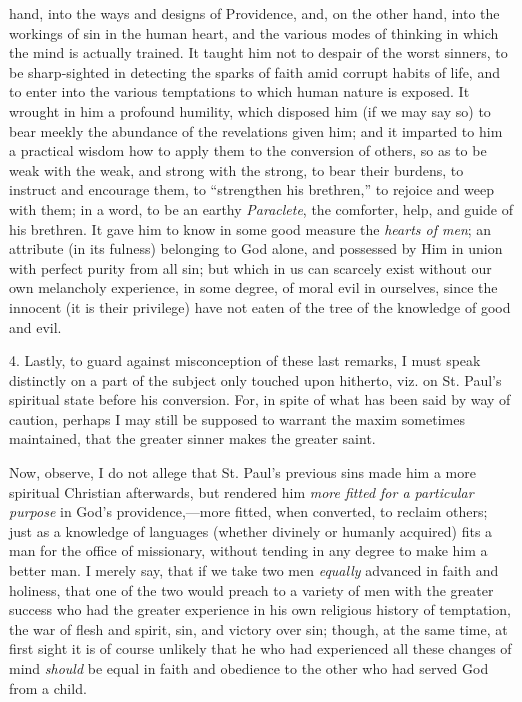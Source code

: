 hand, into the ways and designs of Providence, and, on the other hand,
into the workings of sin in the human heart, and the various modes of
thinking in which the mind is actually trained. It taught him not to
despair of the worst sinners, to be sharp-sighted in detecting the
sparks of faith amid corrupt habits of life, and to enter into the
various temptations to which human nature is exposed. It wrought in
him a profound humility, which disposed him (if we may say so) to bear
meekly the abundance of the revelations given him; and it imparted to
him a practical wisdom how to apply them to the conversion of others,
so as to be weak with the weak, and strong with the strong, to bear
their burdens, to instruct and encourage them, to ``strengthen his
brethren,'' to rejoice and weep with them; in a word, to be an
earthy \emph{Paraclete}, the comforter, help, and guide of his
brethren. It gave him to know in some good measure the \emph{hearts of
men}; an attribute (in its fulness) belonging to God alone, and
possessed by Him in union with perfect purity from all sin; but which
in us can scarcely exist without our own melancholy experience, in
some degree, of moral evil in ourselves, since the innocent (it is
their privilege) have not eaten of the tree of the knowledge of good
and evil.

4. Lastly, to guard against misconception of these last remarks, I
must speak distinctly on a part of the subject only touched upon
hitherto, viz. on St. Paul's spiritual state before his conversion.
For, in spite of what has been said by way of caution, perhaps I may
still be supposed to warrant the maxim sometimes maintained, that the
greater sinner makes the greater saint.

Now, observe, I do not allege that St. Paul's previous sins made
him a more spiritual Christian afterwards, but rendered him \emph{more
fitted for a particular purpose} in God's providence,—more
fitted, when converted, to reclaim others; just as a knowledge of
languages (whether divinely or humanly acquired) fits a man for the
office of missionary, without tending in any degree to make him a
better man. I merely say, that if we take two men \emph{equally}
advanced in faith and holiness, that one of the two would preach to a
variety of men with the greater success who had the greater experience
in his own religious history of temptation, the war of flesh and
spirit, sin, and victory over sin; though, at the same time, at first
sight it is of course unlikely that he who had experienced all these
changes of mind \emph{should} be equal in faith and obedience to the
other who had served God from a child.

